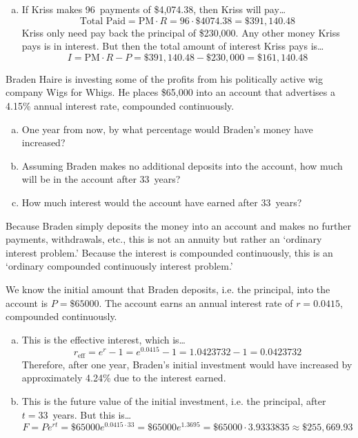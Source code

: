 \documentclass[12pt,letterpaper]{exam}
\begin{document}
\begin{questions}
\begin{enumerate}[(a)]
\item If Kriss makes 96~payments of \$4,074.38, then Kriss will pay\dots
	\[
	\text{Total Paid}= \text{PM} \cdot R= 96 \cdot \$4074.38= \$391,140.48
	\]
Kriss only need pay back the principal of \$230,000. Any other money Kriss pays is in interest. But then the total amount of interest Kriss pays is\dots
	\[
	I= \text{PM} \cdot R - P= \$391\!,140.48 - \$230\!,000= \$161,\!140.48
	\]
\end{enumerate}



\newpage
\question[15] Braden Haire is investing some of the profits from his politically active wig company Wigs for Whigs. He places \$65,000 into an account that advertises a 4.15\% annual interest rate, compounded continuously. 
	\begin{enumerate}[(a)]
	\item One year from now, by what percentage would Braden's money have increased?
	\item Assuming Braden makes no additional deposits into the account, how much will be in the account after 33~years?
	\item How much interest would the account have earned after 33~years?
	\end{enumerate} \pspace

\sol Because Braden simply deposits the money into an account and makes no further payments, withdrawals, etc., this is not an annuity but rather an `ordinary interest problem.' Because the interest is compounded continuously, this is an `ordinary compounded continuously interest problem.' \pspace

We know the initial amount that Braden deposits, i.e. the principal, into the account is $P= \$65000$. The account earns an annual interest rate of $r= 0.0415$, compounded continuously. \pspace

\begin{enumerate}[(a)]
\item This is the effective interest, which is\dots
	\[
	r_{\text{eff}}= e^r - 1= e^{0.0415} - 1= 1.0423732 - 1= 0.0423732
	\]
Therefore, after one year, Braden's initial investment would have increased by approximately 4.24\% due to the interest earned. \pspace

\item This is the future value of the initial investment, i.e. the principal, after $t= 33$~years. But this is\dots 
	\[
	F= Pe^{rt}= \$65000 e^{0.0415 \cdot 33}= \$65000 e^{1.3695}= \$65000 \cdot 3.9333835 \approx \$255,\!669.93
	\] \pspace


\end{enumerate}
\end{questions}
\end{document}
